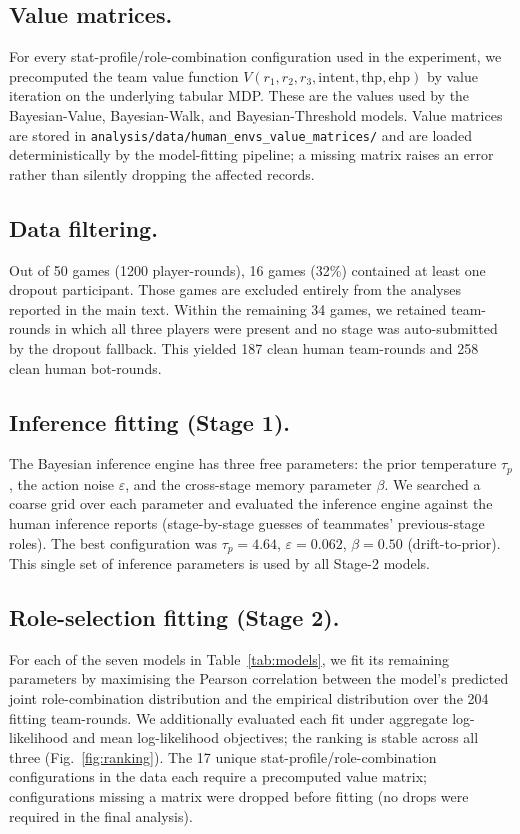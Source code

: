 \documentclass[9pt,twocolumn,twoside]{pnas-new}
\begin{document}
{\subsection*{Value matrices.} For every stat-profile/role-combination
configuration used in the experiment, we precomputed the team value
function $V(r_1,r_2,r_3, \text{intent}, \text{thp}, \text{ehp})$ by
value iteration on the underlying tabular MDP. These are the values
used by the Bayesian-Value, Bayesian-Walk, and Bayesian-Threshold
models. Value matrices are stored in
\texttt{analysis/data/human\_envs\_value\_matrices/} and are loaded
deterministically by the model-fitting pipeline; a missing matrix raises
an error rather than silently dropping the affected records.

\subsection*{Data filtering.} Out of 50 games (1200 player-rounds), 16
games (32\%) contained at least one dropout participant. Those games
are excluded entirely from the analyses reported in the main text.
Within the remaining 34 games, we retained team-rounds in which all
three players were present and no stage was auto-submitted by the
dropout fallback. This yielded 187 clean human team-rounds and 258
clean human bot-rounds.

\subsection*{Inference fitting (Stage 1).} The Bayesian inference
engine has three free parameters: the prior temperature $\tau_p$, the
action noise $\varepsilon$, and the cross-stage memory parameter
$\beta$. We searched a coarse grid over each parameter and evaluated
the inference engine against the human inference reports (stage-by-stage
guesses of teammates' previous-stage roles). The best configuration
was $\tau_p = 4.64$, $\varepsilon = 0.062$, $\beta = 0.50$ (drift-to-prior).
This single set of inference parameters is used by all Stage-2 models.

\subsection*{Role-selection fitting (Stage 2).} For each of the seven
models in Table~\ref{tab:models}, we fit its remaining parameters by
maximising the Pearson correlation between the model's predicted joint
role-combination distribution and the empirical distribution over the
204 fitting team-rounds. We additionally evaluated each fit under
aggregate log-likelihood and mean log-likelihood objectives; the
ranking is stable across all three (Fig.~\ref{fig:ranking}). The 17
unique stat-profile/role-combination configurations in the data each
require a precomputed value matrix; configurations missing a matrix
were dropped before fitting (no drops were required in the final
analysis).

}
\end{document}
